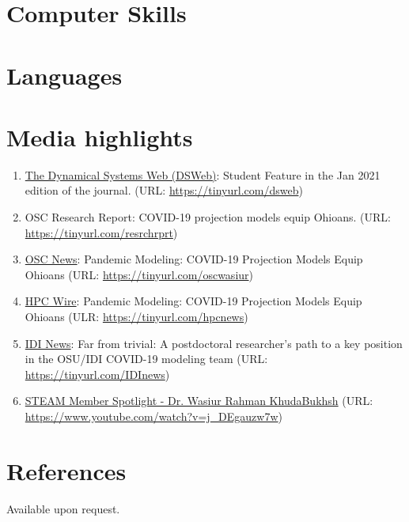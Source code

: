 \documentclass[11pt,a4paper,sans]{moderncv}        %
\begin{document}
\section{Computer Skills}

\section{Languages}

\section{Media highlights}
\begin{enumerate}
\item \href{https://dsweb.siam.org/The-Magazine/Article/student-feature-wasiur-rahman-khuda-bukhsh}{The Dynamical Systems Web (DSWeb)}: Student Feature in the Jan 2021 edition of the journal. (URL: \url{https://tinyurl.com/dsweb})
\item {OSC Research Report}: COVID-19 projection models equip Ohioans. (URL: \url{https://tinyurl.com/resrchrprt})
\item \href{https://www.osc.edu/press/pandemic_modeling_covid_19_projection_models_equip_ohioans}{OSC News}: Pandemic Modeling: COVID-19 Projection Models Equip Ohioans (URL: \url{https://tinyurl.com/oscwasiur})
\item \href{https://www.hpcwire.com/off-the-wire/pandemic-modeling-covid-19-projection-models-equip-ohioans/}{HPC Wire}: Pandemic Modeling: COVID-19 Projection Models Equip Ohioans (ULR: \url{https://tinyurl.com/hpcnews})
\item \href{https://idi.osu.edu/news-articles/far-from-trivial}{IDI News}: Far from trivial: A postdoctoral researcher's path to a key position in the OSU/IDI COVID-19 modeling team (URL: \url{https://tinyurl.com/IDInews})
\item \href{https://www.youtube.com/watch?v=j_DEgauzw7w}{STEAM Member Spotlight - Dr. Wasiur Rahman KhudaBukhsh} (URL: \url{https://www.youtube.com/watch?v=j_DEgauzw7w})
\end{enumerate}

\section{References}
Available upon request. 
\end{document}
